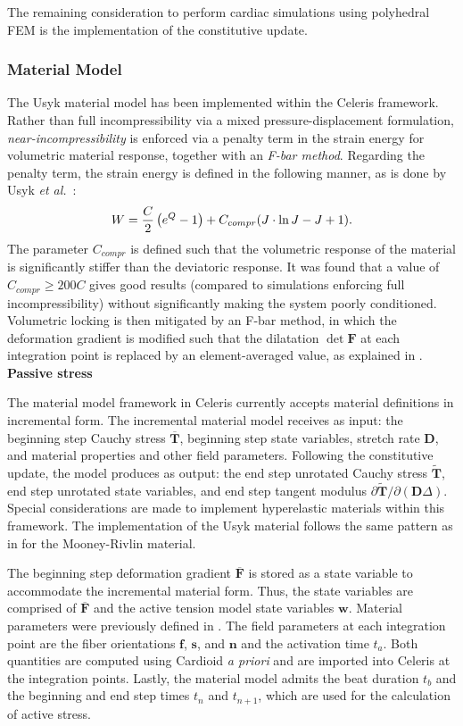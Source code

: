 The remaining consideration to perform cardiac simulations using polyhedral FEM is the implementation of the constitutive update.

\subsubsection{Material Model}
The Usyk material model has been implemented within the Celeris framework. Rather than full incompressibility via a mixed pressure-displacement formulation, \textit{near-incompressibility} is enforced via a penalty term in the strain energy for volumetric material response, together with an \textit{F-bar method}. Regarding the penalty term, the strain energy is defined in the following manner, as is done by Usyk \textit{et al.}~\cite{usyk_2002}:
\begin{equation}
W = \frac{C}{2}\left(e^Q -1\right) + C_{compr} (J \cdot \ln J - J + 1). \\
\end{equation}
The parameter $C_{compr}$ is defined such that the volumetric response of the material is significantly stiffer than the deviatoric response. It was found that a value of \mbox{$C_{compr} \geq 200  C$} gives good results (compared to simulations enforcing full incompressibility) without significantly making the system poorly conditioned. Volumetric locking is then mitigated by an F-bar method, in which the deformation gradient is modified such that the dilatation $\det\bm{F}$ at each integration point is replaced by an element-averaged value, as explained in .
\vfil \break
\textbf{Passive stress}

The material model framework in Celeris currently accepts material definitions in incremental form. The incremental material model receives as input: the beginning step Cauchy stress $\overline{\bm{T}}$, beginning step state variables, stretch rate $\bm{D}$, and material properties and other field parameters. Following the constitutive update, the model produces as output: the end step unrotated Cauchy stress $\tilde{\bm{T}}$, end step unrotated state variables, and end step tangent modulus ${\partial \tilde{\bm{T}}}/{\partial (\bm{D}\Delta)}$. Special considerations are made to implement hyperelastic materials within this framework. The implementation of the Usyk material follows the same pattern as in  for the Mooney-Rivlin material.

The beginning step deformation gradient $\overline{\bm{F}}$ is stored as a state variable to accommodate the incremental material form. Thus, the state variables are comprised of $\overline{\bm{F}}$ and the active tension model state variables $\bm{w}$. Material parameters were previously defined in . The field parameters at each integration point are the fiber orientations $\bm{f}$, $\bm{s}$, and $\bm{n}$ and the activation time $t_a$. Both quantities are computed using Cardioid \textit{a priori} and are imported into Celeris at the integration points. Lastly, the material model admits the beat duration $t_b$ and the beginning and end step times $t_n$ and $t_{n+1}$, which are used for the calculation of active stress.

